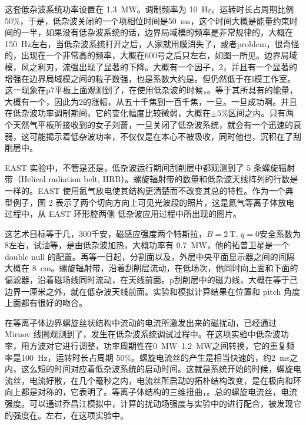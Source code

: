 这套低杂波系统功率设置在 \SI{1.3}{\mega\watt}。调制频率为 \SI{10}{\hertz}。运转时长占周期比例 50\%，于是，低杂波关闭的一个项相位时间是\SI{50}{\milli\second}，这个时间大概是能量约束时间的一半，如果没有低杂波系统的话，边界局域模的频率是非常规律的，大概在 \SI{150}{\hertz}左右，当低杂波系统打开之后，人家就用膜消失了，或者problem，很奇怪的，出现在一个非常高的频率，大概在600号之后只左右，如图一所见。边界局域模，风之利刃，流强出现了显著的下降。大概有一个因子，2，并且有一个显著的增强在边界局域模之间的粒子数强，也是系数大约是。但仍然低于在l模工作室。这一现象在p7平板上面观测到了，在使用低杂波的时候，。等于其所具有的能量，大概有一个，因此为2的涨幅，从五十千焦到一百千焦，一旦\Hmode 。一旦\Hmode 成功啊。并且在低杂波功率调制期间，它的变化幅度比较微弱，大概在$\pm 5\%$区间之内。只有两个天然气平板所接收到的女子刘蔷，一旦关闭了低杂波系统，就会有一个迅速的衰弱，这可能揭示着低杂波功率，不仅仅是在本心不被吸收，同时他也，沉积在了刮削层中。

EAST 实验中，不管是\Lmode 还是\Hmode ，低杂波运行期间刮削层中都观测到了 5 条螺旋辐射带（Helical radiation belt, HRB）。螺旋辐射带的数量和低杂波天线阵列的行数是一样的。EAST 使用氦气放电使其结构更清楚而不改变其总的特性。作为一个典型例子，图 2 表示了两个切向方向上可见光波段的照片，这是氦气等离子体放电过程中，从 EAST 环形腔两侧 低杂波应用过程中所出现的图片。



这艺术目标等于几，300千安，磁感应强度两个特斯拉，$B=\SI{2}{\tesla}$, $q=0$安全系数为8左右，试油等，是由低杂波加热，大概功率有 \SI{0.7}{\mega\watt}，他的拓普卫星是一个 double null 的配置。再等一日起，分割面以及，外层中央平面显示器之间的间隔大概在 \SI{8}{\centi\metre}。螺旋辐射带，沿着刮削层流动，在低场次，他同时向上面和下面的偏滤器，沿着磁场线同时流动，在天线前面。p刮削层中的磁力线，大概在等于己边界一厘米之外，就在低杂波天线前面。实验和模拟计算结果在位置和 pitch 角度上面都有很好的吻合。


在等离子体边界螺旋丝状结构中流动的电流所激发出来的磁扰动，已经通过 Mirnov 线圈观测到了，发生在低杂波系统调试过程中。在这项实验中低杂波功率，用方波对它进行调整，功率周期性在\SIrange{0}{1.2}{\mega\watt}之间转换，它的重复频率是\SI{100}{\hertz}，运转时长占周期 50\%。螺旋电流丝的产生是相当快速的，约\SI{2}{\milli\second}之内，这么短的时间对应着低杂波系统的启动时间。这就是系统开始的时候，螺旋电流丝，电流好散，在几个毫秒之内，电流丝所启动的拓朴结构改变，是在极向和环向上都是对称的，它表明了。等离子体结构的三维扭曲，。总的螺旋电流丝，电流强度。可以通过乔昌江模拟中，计算的扰动场强度与实验中的进行配合，被发现它的强度在。左右，在这项实验中。

